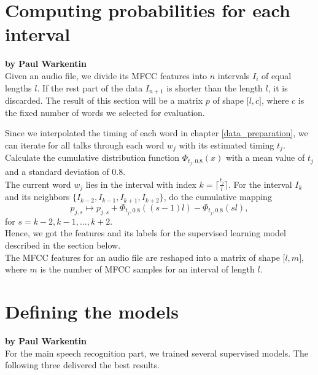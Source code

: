 \section{Computing probabilities for each interval}
\label{interval_word_prob}

\textbf{by Paul Warkentin} \\

Given an audio file, we divide its MFCC features into $n$ intervals $I_i$ of equal lengths $l$. If the rest part of the data $I_{n+1}$ is shorter than the length $l$, it is discarded. The result of this section will be a matrix $p$ of shape $\lbrack l, c \rbrack$, where $c$ is the fixed number of words we selected for evaluation.

Since we interpolated the timing of each word in chapter \ref{data_preparation}, we can iterate for all talks through each word $w_j$ with its estimated timing $t_j$. Calculate the cumulative distribution function $\Phi_{t_j, 0.8}(x)$ with a mean value of $t_j$ and a standard deviation of 0.8. \\
The current word $w_j$ lies in the interval with index $k = \lceil \tfrac{t_j}{l} \rceil$. For the interval $I_k$ and its neighbors $\{I_{k-2}, I_{k-1}, I_{k+1}, I_{k+2}\}$, do the cumulative mapping
\[p_{j, s} \mapsto p_{j, s} + \Phi_{t_j, 0.8}((s - 1) l) - \Phi_{t_j, 0.8}(s l),\]
for $s = k-2, k-1, \dots, k+2$. \\

Hence, we got the features and its labels for the supervised learning model described in the section below. \\
The MFCC features for an audio file are reshaped into a matrix of shape $\lbrack l, m \rbrack$, where $m$ is the number of MFCC samples for an interval of length $l$.

\newpage
\section{Defining the models}

\textbf{by Paul Warkentin} \\


For the main speech recognition part, we trained several supervised models. The following three delivered the best results.

